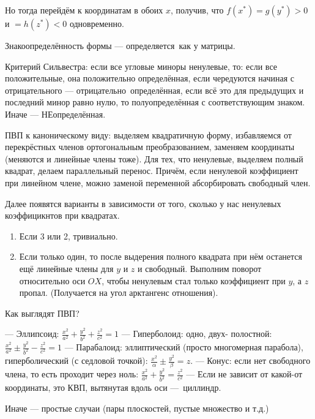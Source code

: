 \documentclass[12pt, a4paper]{article}
\begin{document}
Но тогда перейдём к координатам в обоих $x$, получив, что $f(x^*) = g(y^*) > 0$ и $= h(z^*) < 0$ одновременно. 

Знакоопределённость формы — определяется как у матрицы.

Критерий Сильвестра: если все угловые миноры ненулевые, то: 
если все положительные, она положительно определённая, если чередуются начиная с отрицательного — отрицательно определённая,
если всё это для предыдущих и последний минор равно нулю, то полуопределённая с соответствующим знаком. Иначе — НЕопределённая.

ПВП к каноническому виду: выделяем квадратичную форму, избавляемся от перекрёстных членов ортогональным преобразованием, заменяем координаты (меняются и линейные члены тоже).
Для тех, что ненулевые, выделяем полный квадрат, делаем параллельный перенос. Причём, если ненулевой коэффициент при линейном члене, можно заменой переменной абсорбировать свободный член.

Далее появятся варианты в зависимости от того, сколько у нас ненулевых коэффицикнтов при квадратах.

\begin{enumerate}
    \item Если 3 или 2, тривиально.
    \item Если только один, то после выдерения полного квадрата при нём останется ещё линейные члены для $y$ и $z$ и свободный. 
    Выполним поворот относительно оси $OX$, чтобы ненулевым стал только коэффициент при $y$, а $z$ пропал. (Получается на угол арктангенс отношения).
\end{enumerate}

Как выглядят ПВП?

— Эллипсоид: $\frac{x^2}{a^2} + \frac{y^2}{b^2} + \frac{z^2}{c^2} = 1$
— Гиперболоид: одно, двух- полостной: $\frac{x^2}{a^2} ± \frac{y^2}{b^2} - \frac{z^2}{c^2} = 1$
— Парабалоид: эллиптический (просто многомерная парабола), гиперболический (с седловой точкой): $\frac{x^2}{\alpha} ± \frac{y^2}{\beta} = z$.
— Конус: если нет свободного члена, то есть проходит через ноль: $\frac{x^2}{a^2} + \frac{y^2}{b^2} = \frac{z^2}{c^2}$
— Если не зависит от какой-от координаты, это КВП, вытянутая вдоль оси — циллиндр.

Иначе — простые случаи (пары плоскостей, пустые множество и т.д.)
\end{document}
